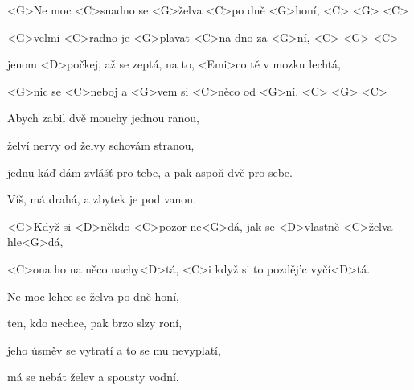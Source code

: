 

\zs
<G>Ne moc <C>snadno se <G>želva <C>po dně <G>honí, <C> <G> <C>

<G>velmi <C>radno je <G>plavat <C>na dno za <G>ní, <C> <G> <C>

{jenom} <D>počkej, až se zeptá, na to, <Emi>co tě v mozku lechtá,

<G>nic se <C>neboj a <G>vem si <C>něco od <G>ní. <C> <G> <C>
\ks

\zs
Abych zabil dvě mouchy jednou ranou,

želví nervy od želvy schovám stranou,

jednu káď dám zvlášť pro tebe, a pak aspoň dvě pro sebe.

Víš, má drahá, a zbytek je pod vanou.
\ks

\zr
<G>Když si <D>někdo <C>pozor ne<G>dá, jak se <D>vlastně <C>želva hle<G>dá,

<C>ona ho na {něco} nachy<D>tá, <C>i když si to pozděj’c 
vyčí<D>tá.
\kr

\zs
Ne moc lehce se želva po dně honí,

ten, kdo nechce, pak brzo slzy roní,

jeho úsměv se vytratí a to se mu nevyplatí,

má se nebát želev a spousty vodní.
\ks

\zr \kr

\kp


















